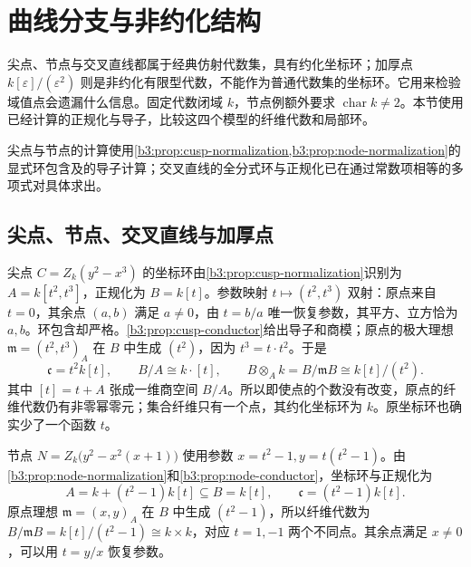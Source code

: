 
\section{曲线分支与非约化结构}
\label{b3:sec:0704}

尖点、节点与交叉直线都属于经典仿射代数集，具有约化坐标环；加厚点 \(k[\varepsilon]/(\varepsilon^2)\) 则是非约化有限型代数，不能作为普通代数集的坐标环。它用来检验域值点会遗漏什么信息。固定代数闭域 \(k\)，节点例额外要求 \(\operatorname{char}k\ne2\)。本节使用已经计算的正规化与导子，比较这四个模型的纤维代数和局部环。

尖点与节点的计算使用\cref{b3:prop:cusp-normalization,b3:prop:node-normalization}的显式环包含及的导子计算；交叉直线的全分式环与正规化已在通过常数项相等的多项式对具体求出。

\subsection{尖点、节点、交叉直线与加厚点}
\label{b3:subsec:0704:01}

尖点 \(C=Z_k(y^2-x^3)\) 的坐标环由\cref{b3:prop:cusp-normalization}识别为 \(A=k[t^2,t^3]\)，正规化为 \(B=k[t]\)。参数映射 \(t\mapsto(t^2,t^3)\) 双射：原点来自 \(t=0\)，其余点 \((a,b)\) 满足 \(a\ne0\)，由 \(t=b/a\) 唯一恢复参数，其平方、立方恰为 \(a,b\)。环包含却严格。\cref{b3:prop:cusp-conductor}给出导子和商模；原点的极大理想 \(\mathfrak m=(t^2,t^3)_A\) 在 \(B\) 中生成 \((t^2)\)，因为 \(t^3=t\cdot t^2\)。于是
\[
	\mathfrak c=t^2k[t],\qquad B/A\cong k\cdot[t], \qquad B\otimes_Ak=B/\mathfrak mB\cong k[t]/(t^2).
\]
其中 \([t]=t+A\) 张成一维商空间 \(B/A\)。所以即使点的个数没有改变，原点的纤维代数仍有非零幂零元；集合纤维只有一个点，其约化坐标环为 \(k\)。原坐标环也确实少了一个函数 \(t\)。

\ProseParagraphBreak
节点 \(N=Z_k\bigl(y^2-x^2(x+1)\bigr)\) 使用参数 \(x=t^2-1,y=t(t^2-1)\)。由\cref{b3:prop:node-normalization}和\cref{b3:prop:node-conductor}，坐标环与正规化为
\[
	A=k+(t^2-1)k[t]\subseteq B=k[t],\qquad \mathfrak c=(t^2-1)k[t].
\]
原点理想 \(\mathfrak m=(x,y)_A\) 在 \(B\) 中生成 \((t^2-1)\)，所以纤维代数为 \(B/\mathfrak mB=k[t]/(t^2-1)\cong k\times k\)，对应 \(t=1,-1\) 两个不同点。其余点满足 \(x\ne0\)，可以用 \(t=y/x\) 恢复参数。

